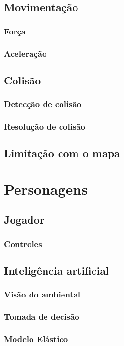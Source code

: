 \subsection{Movimentação}
\subsubsection{Força}
\subsubsection{Aceleração}

\subsection{Colisão}
\subsubsection{Detecção de colisão}
\subsubsection{Resolução de colisão}

\subsection{Limitação com o mapa}

\section{Personagens}

\subsection{Jogador}
\subsubsection{Controles}

\subsection{Inteligência artificial}
\subsubsection{Visão do ambiental}
\subsubsection{Tomada de decisão}
\subsubsection{Modelo Elástico}